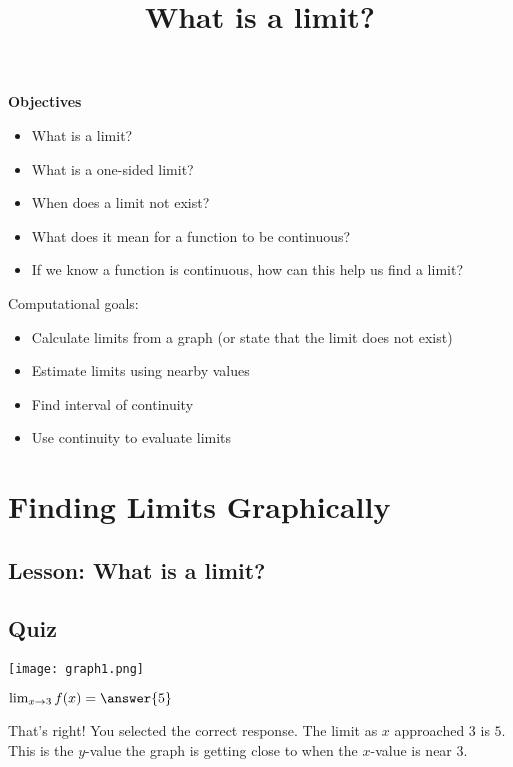 \documentclass{ximera}
\title{What is a limit?}
\newenvironment{objectives}{\begin{remark}\textbf{Objectives}\\}{\end{remark}}
\begin{document}
\begin{abstract}
\end{abstract}

\maketitle


\begin{objectives}


\begin{itemize}
    \item What is a limit?
    \item What is a one-sided limit?
    \item When does a limit not exist?
    \item What does it mean for a function to be continuous?
    \item If we know a function is continuous, how can this help us find a limit?
\end{itemize}

Computational goals:

\begin{itemize}
    \item Calculate limits from a graph (or state that the limit does not exist)
    \item Estimate limits using nearby values
    \item Find interval of continuity
    \item Use continuity to evaluate limits
\end{itemize}


\end{objectives}

\section{Finding Limits Graphically}
\subsection{Lesson: What is a limit?}

\begin{center}  
\end{center}

\subsection{Quiz}

\texttt{[image: graph1.png]}
\begin{question}  
$\lim_{x \to 3} f(x) = \answer{5}$  

\begin{explanation}
    That's right! You selected the correct response. The limit as $x$ approached $3$ is $5$. This is the $y$-value the graph is getting close to when the $x$-value is near $3$.
\end{explanation}
\end{question}
\end{document}
